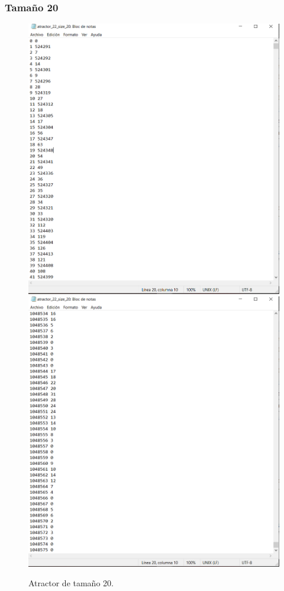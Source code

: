 \documentclass[11pt]{article}
\begin{document}
			\subsubsection{Tamaño 20}
			\begin{figure}[H]
			\centering
			\includegraphics[scale=0.3]{resources/Atractores22/atractor_22_size_20.png}
			\includegraphics[scale=0.3]{resources/Atractores22/atractor_22_size_201.png}
			\caption{Atractor de tamaño 20.}\label{fig:picture}
			\end{figure}
\end{document}
